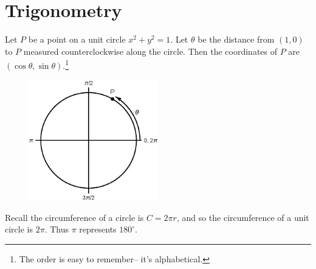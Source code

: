 
\section{Trigonometry}

Let $P$ be a point on a unit circle $x^2+y^2=1$. Let $\theta$ be the
distance from $(1,0)$ to $P$ measured counterclockwise along the
circle. Then the coordinates of $P$ are
$(\cos\theta,\sin\theta)$.\footnote{The order is easy to remember-- it's
  alphabetical.}

\begin{figure}[htbp]
  \centering
  \includegraphics[width=0.5\textwidth]{trigtldr.eps}
\end{figure}

Recall the circumference of a circle is $C=2\pi r$, and so the
circumference of a unit circle is $2\pi$. Thus $\pi$ represents $180^\circ$.

